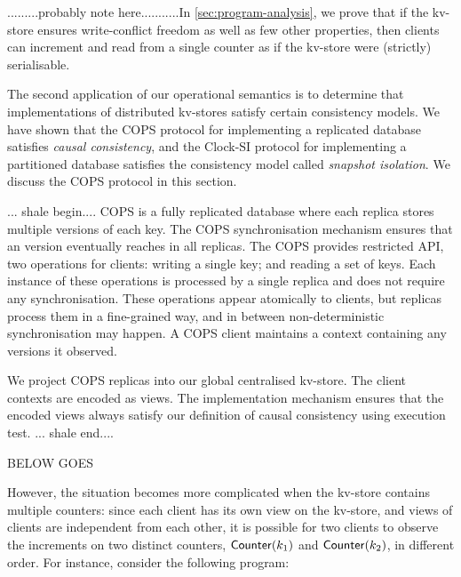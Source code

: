 .........probably note here...........In \cref{sec:program-analysis}, we prove that if the kv-store 
ensures write-conflict freedom as well as few other properties, then clients can increment 
and read from a single counter as if the kv-store were (strictly) serialisable.



The second application of our operational
semantics is to determine that implementations of distributed
kv-stores satisfy certain consistency models. We have shown that the
COPS protocol \citep{cops} for implementing a replicated database satisfies {\em
  causal consistency},  and the Clock-SI protocol \citep{clocksi} for implementing a
partitioned database satisfies the consistency model called {\em
  snapshot isolation}. We discuss the  COPS protocol  in this section. 

... shale begin....
COPS is a fully replicated database where each replica stores multiple versions of each key. 
The COPS synchronisation mechanism ensures that an version eventually reaches in all replicas.
The COPS provides restricted API, two operations for clients: 
writing a single key; and reading a set of keys. 
Each instance of these operations is processed by a single replica and does not require any synchronisation.
These operations appear atomically to clients, but replicas process them in a fine-grained way,
and in between non-deterministic synchronisation may happen.
A COPS client maintains a context containing any versions it observed.

We project COPS replicas into our global centralised kv-store.
The client contexts are encoded as views.
The implementation mechanism ensures that the encoded views always satisfy
our definition of causal consistency using execution test.
... shale end....


\newpage
BELOW GOES



However, the situation becomes more complicated when the kv-store contains multiple counters:  
since each client has its own view on the kv-store, and views of clients are independent from each other, it is possible for two 
clients to observe the increments on two distinct counters, $\mathsf{Counter}(k_1)$ and $\mathsf{Counter}(k_2)$, in different order. 
For instance, consider the following program:

